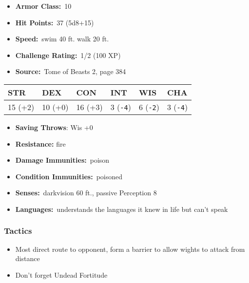 \documentclass[10pt,twocolumn]{article}
\let\oldtextbf\textbf
\renewcommand{\textbf}[1]{\oldtextbf{{#1}}}
\providecommand{\tightlist}{
  \setlength{\itemsep}{4pt}
  \setlength{\topsep}{0pt}
  \setlength{\parsep}{0pt}
  \setlength{\parskip}{0pt}
  \setlength{\partopsep}{0pt}
}
\begin{document}
\setlength{\itemsep}{0pt}

\begin{itemize}
\tightlist
\item
  \textbf{Armor Class:}~10
\item
  \textbf{Hit Points:}~37 (5d8+15)
\item
  \textbf{Speed:}~swim 40 ft. walk 20 ft.
\item
  \textbf{Challenge Rating:}~1/2 (100 XP)
\item
  \textbf{Source:}~Tome of Beasts 2, page 384
\end{itemize}

\begin{center}
{\sffamily\fontsize{8pt}{8pt}\selectfont
{}
\begin{tabular}{llllll}
\toprule
\textbf{STR} & \textbf{DEX} & \textbf{CON} & \textbf{INT} & \textbf{WIS} & \textbf{CHA} \\
\midrule
15 (+2) & 10 (+0) & 16 (+3) & 3 (\texttt{-4}) & 6 (\texttt{-2}) & 3 (\texttt{-4}) \\
\bottomrule
\end{tabular}}
\end{center}

\setlength{\itemsep}{0pt}

\begin{itemize}
\tightlist
\item
  \textbf{Saving Throws}: Wis +0
\item
  \textbf{Resistance:} fire
\item
  \textbf{Damage Immunities:}~poison
\item
  \textbf{Condition Immunities:}~poisoned
\item
  \textbf{Senses:}~darkvision 60 ft., passive Perception 8
\item
  \textbf{Languages:}~understands the languages it knew in life but
  can't speak
\end{itemize}

\subsubsection{Tactics}\label{tactics-4}

\setlength{\itemsep}{0pt}

\begin{itemize}
\tightlist
\item
  Most direct route to opponent, form a barrier to allow wights to
  attack from distance
\item
  Don't forget Undead Fortitude
\end{itemize}
\end{document}
